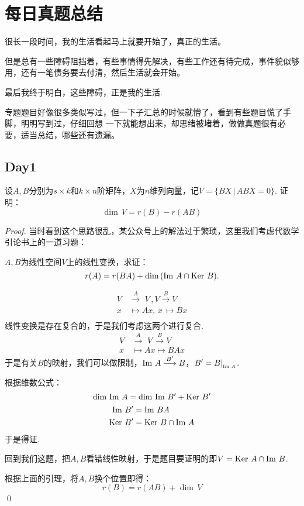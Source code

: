 
\chapter{每日真题总结}

\begin{introduction}
	\item 很长一段时间，我的生活看起马上就要开始了，真正的生活。
	\item 但是总有一些障碍阻挡着，有些事情得先解决，有些工作还有待完成，事件貌似够用，还有一笔债务要去付清，然后生活就会开始。
	\item 最后我终于明白，这些障碍，正是我的生活.
\end{introduction}

专题题目好像很多类似写过，但一下子汇总的时候就懵了，看到有些题目慌了手脚，明明写到过，仔细回想
一下就能想出来，却思绪被堵着，做做真题很有必要，适当总结，哪些还有遗漏。

\section*{Day1}

\begin{ex}[苏大2022]
	设$A,B$分别为$s \times k$和$k \times n$阶矩阵，$X$为$n$维列向量，记$V = \{ BX \,|\, ABX = 0 \}$. 证明：
	$$
		\dim \, V = r(B) - r(AB)
	$$
\end{ex}

\begin{proof}
	当时看到这个思路很乱，某公众号上的解法过于繁琐，这里我们考虑代数学引论书上的一道习题：

	$A,B$为线性空间$V$上的线性变换，求证：
	$$
		r(A) = r(BA) + \dim \, (\text{Im}\, \, A \cap \text{Ker}\, \, B).
	$$

	\begin{align*}
		V &\stackrel{A}{\longrightarrow } \,\,V\,, V \stackrel{B}{\longrightarrow} V\\
		x \,&\longmapsto  Ax, \,x\, \longmapsto Bx \\
	\end{align*}
	线性变换是存在复合的，于是我们考虑这两个进行复合.
	\begin{align*}
		V &\stackrel{A}{\longrightarrow } \,\,V\, \stackrel{B}{\longrightarrow } V \\
		x\, &\longmapsto  Ax \longmapsto BAx
	\end{align*}
	于是有关$B$的映射，我们可以做限制，$\text{Im}\, \, A \stackrel{B^\prime}{\longrightarrow } B$，$B^\prime = B|_{_{\text{Im}\, \, A}}$.

	根据维数公式：
	$$
		\dim \, \text{Im}\, \, A = \dim \, \text{Im}\, \, B^\prime + \text{Ker}\, \, B^\prime 
	$$
	\begin{align*}
		\text{Im}\, \, B^\prime &= \text{Im}\, \, BA \\
		\text{Ker}\, \, B^\prime &= \text{Ker}\, \, B \cap \text{Im}\, \, A
	\end{align*}
	于是得证.

	回到我们这题，把$A,B$看错线性映射，于是题目要证明的即$V = \text{Ker}\, \,A \cap \text{Im}\, \, B$.

	根据上面的引理，将$A,B$换个位置即得：
	$$
		r(B) = r(AB) + \dim \, V
	$$
	\qed{}
\end{proof}

